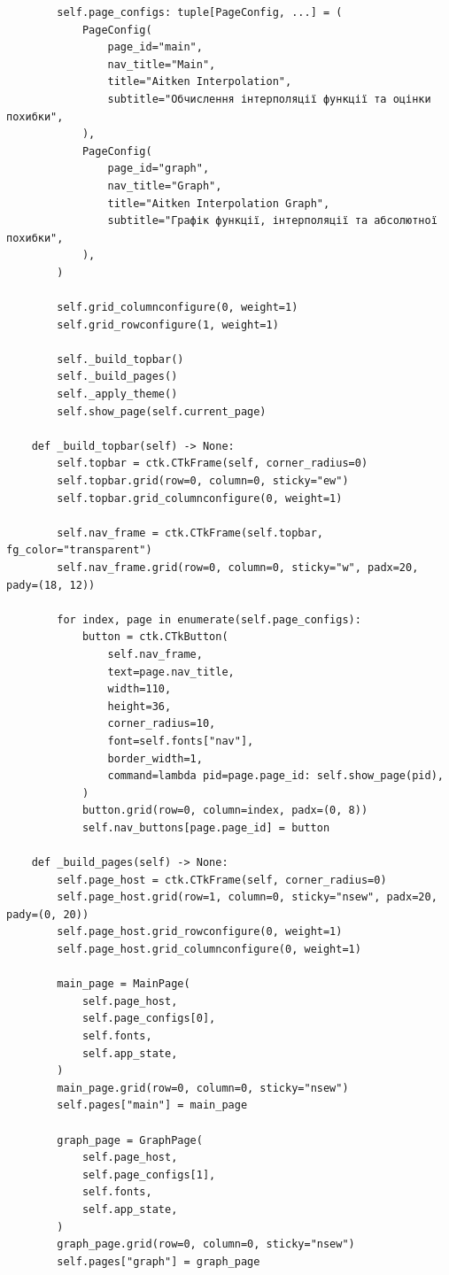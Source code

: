 \documentclass[12pt,a4paper]{article}
\begin{document}
\begin{verbatim}
        self.page_configs: tuple[PageConfig, ...] = (
            PageConfig(
                page_id="main",
                nav_title="Main",
                title="Aitken Interpolation",
                subtitle="Обчислення інтерполяції функції та оцінки похибки",
            ),
            PageConfig(
                page_id="graph",
                nav_title="Graph",
                title="Aitken Interpolation Graph",
                subtitle="Графік функції, інтерполяції та абсолютної похибки",
            ),
        )

        self.grid_columnconfigure(0, weight=1)
        self.grid_rowconfigure(1, weight=1)

        self._build_topbar()
        self._build_pages()
        self._apply_theme()
        self.show_page(self.current_page)

    def _build_topbar(self) -> None:
        self.topbar = ctk.CTkFrame(self, corner_radius=0)
        self.topbar.grid(row=0, column=0, sticky="ew")
        self.topbar.grid_columnconfigure(0, weight=1)

        self.nav_frame = ctk.CTkFrame(self.topbar, fg_color="transparent")
        self.nav_frame.grid(row=0, column=0, sticky="w", padx=20, pady=(18, 12))

        for index, page in enumerate(self.page_configs):
            button = ctk.CTkButton(
                self.nav_frame,
                text=page.nav_title,
                width=110,
                height=36,
                corner_radius=10,
                font=self.fonts["nav"],
                border_width=1,
                command=lambda pid=page.page_id: self.show_page(pid),
            )
            button.grid(row=0, column=index, padx=(0, 8))
            self.nav_buttons[page.page_id] = button

    def _build_pages(self) -> None:
        self.page_host = ctk.CTkFrame(self, corner_radius=0)
        self.page_host.grid(row=1, column=0, sticky="nsew", padx=20, pady=(0, 20))
        self.page_host.grid_rowconfigure(0, weight=1)
        self.page_host.grid_columnconfigure(0, weight=1)

        main_page = MainPage(
            self.page_host,
            self.page_configs[0],
            self.fonts,
            self.app_state,
        )
        main_page.grid(row=0, column=0, sticky="nsew")
        self.pages["main"] = main_page

        graph_page = GraphPage(
            self.page_host,
            self.page_configs[1],
            self.fonts,
            self.app_state,
        )
        graph_page.grid(row=0, column=0, sticky="nsew")
        self.pages["graph"] = graph_page


\end{verbatim}
\end{document}
